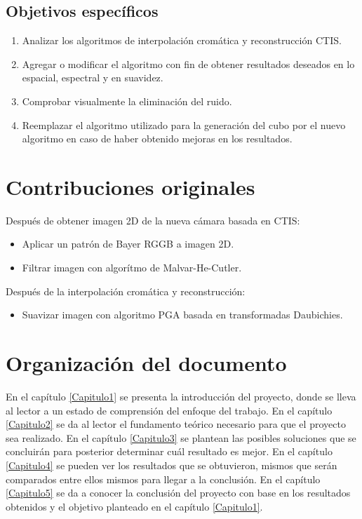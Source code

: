 \subsection{Objetivos específicos}
\begin{enumerate}
\item Analizar los algoritmos de interpolación cromática y reconstrucción CTIS.
\item Agregar o modificar el algoritmo con fin de obtener resultados deseados en lo espacial, espectral y en suavidez.
\item Comprobar visualmente la eliminación del ruido.
\item Reemplazar el algoritmo utilizado para la generación del cubo por el nuevo algoritmo en caso de haber obtenido mejoras en los resultados. 
\end{enumerate}

\section{Contribuciones originales}
Después de obtener imagen 2D de la nueva cámara\cite{JairoCamera} basada en CTIS\cite{PracCam}:
\begin{itemize}
\item Aplicar un patrón de Bayer RGGB a imagen 2D.
\item Filtrar imagen con algorítmo de Malvar-He-Cutler.
\end{itemize}
Después de la interpolación cromática y reconstrucción: 
\begin{itemize}
\item Suavizar imagen con algoritmo PGA basada en transformadas Daubichies.
\end{itemize}

\section{Organización del documento}
En el capítulo \ref{Capitulo1} se presenta la introducción del proyecto, donde se lleva al lector a un estado de comprensión del enfoque del trabajo.
En el capítulo \ref{Capitulo2} se da al lector el fundamento teórico necesario para que el proyecto sea realizado.
En el capítulo \ref{Capitulo3} se plantean las posibles soluciones que se concluirán para posterior determinar cuál resultado es mejor.
En el capítulo \ref{Capitulo4} se pueden ver los resultados que se obtuvieron, mismos que serán comparados entre ellos mismos para llegar a la conclusión.
En el capítulo \ref{Capitulo5} se da a conocer la conclusión del proyecto con base en los resultados obtenidos y el objetivo planteado en el capítulo \ref{Capitulo1}.
